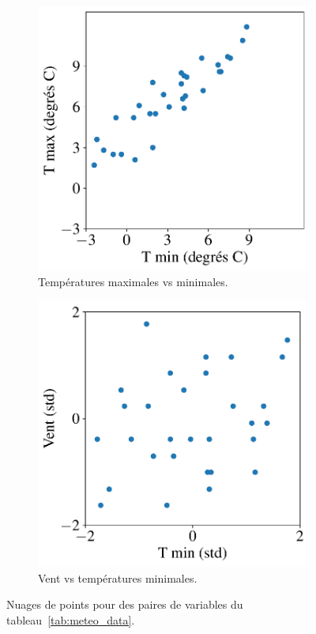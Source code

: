 \begin{figure}[h]
	\centering
	\begin{subfigure}[t]{0.49\textwidth}
		\centering
		\includegraphics[width=.7\textwidth]{figures/stats/meteo_tmin_tmax}
		\caption{Températures maximales vs minimales.}
		\label{fig:meteo_tmin_tmax}
	\end{subfigure} \hfill
	\begin{subfigure}[t]{0.49\textwidth}
		\centering
		\includegraphics[width=.7\textwidth]{figures/stats/meteo_tmin_vent}
		\caption{Vent vs températures minimales.}
		\label{fig:meteo_tmin_vent}
	\end{subfigure}
	\caption{Nuages de points pour des paires de variables du
		tableau~\ref{tab:meteo_data}.}
\end{figure}


